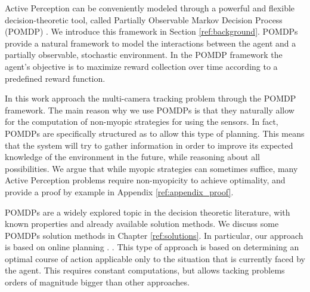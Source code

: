 
Active Perception can be conveniently modeled through a powerful and flexible decision-theoretic
tool, called Partially Observable Markov Decision Process (POMDP) \cite{cit:pomdp}. We introduce
this framework in Section  \ref{ref:background}. POMDPs provide a natural framework to model the
interactions between the agent and a partially observable, stochastic environment.  In the POMDP
framework the agent's objective is to maximize reward collection over time according to a predefined
reward function.

In this work  approach the multi-camera tracking problem through the POMDP framework.  The main
reason why we use POMDPs is that they naturally allow for the computation of non-myopic strategies
for using the sensors. In fact, POMDPs are specifically structured as to allow this type of
planning. This means that the system will try to gather information in order to improve its expected
knowledge of the environment in the future, while reasoning about all possibilities. We argue that
while myopic strategies can sometimes suffice, many Active Perception problems require non-myopicity
to achieve optimality, and provide a proof by example in Appendix \ref{ref:appendix_proof}.

%

POMDPs are a widely explored topic in the decision theoretic literature, with known properties and
already available solution methods. We discuss some POMDPs solution methods in Chapter
\ref{ref:solutions}.
In particular, our approach is based on online planning . . This type of approach is based on 
determining an optimal course of action applicable only to the situation that is currently faced by
the agent. This requires constant computations, but allows tacking problems orders of magnitude
bigger than other approaches.

